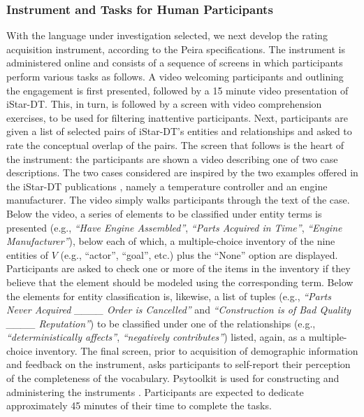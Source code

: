\subsubsection{Instrument and Tasks for Human Participants}

With the language under investigation selected, we next develop the rating acquisition instrument, according to the Peira specifications. The instrument is administered online and consists of a sequence of screens in which participants perform various tasks as follows. A video welcoming participants and outlining the engagement is first presented, followed by a 15 minute video presentation of iStar-DT. This, in turn, is followed by a screen with video comprehension exercises, to be used for filtering inattentive participants. Next, participants are given a list of selected pairs of iStar-DT's entities and relationships and asked to rate the conceptual overlap of the pairs. The screen that follows is the heart of the instrument: the participants are shown a video describing one of two case descriptions. The two cases considered are inspired by the two examples offered in the iStar-DT publications \cite{LKMG.24,LDKM+26}, namely a temperature controller and an engine manufacturer. The video simply walks participants through the text of the case. Below the video, a series of elements to be classified under entity terms is presented (e.g., \textit{``Have Engine Assembled''}, \textit{``Parts Acquired in Time''}, \textit{``Engine Manufacturer''}), below each of which, a multiple-choice inventory of the nine entities of $V$ (e.g., ``actor'', ``goal'', etc.) plus the ``None'' option are displayed. Participants are asked to check one or more of the items in the inventory if they believe that the element should be modeled using the corresponding term. Below the elements for entity classification is, likewise, a list of tuples (e.g., \textit{``Parts Never Acquired \_\_\_\_ Order is Cancelled''} and \textit{``Construction is of Bad Quality \_\_\_\_ Reputation''}) to be classified under one of the relationships (e.g., \textit{``deterministically affects''}, \textit{``negatively contributes''}) listed, again, as a multiple-choice inventory. The final screen, prior to acquisition of demographic information and feedback on the instrument, asks participants to self-report their perception of the completeness of the vocabulary. Psytoolkit is used for constructing and administering the instruments \cite{Stoe.10,Stoe.17}. Participants are expected to dedicate approximately 45 minutes of their time to complete the tasks.  

